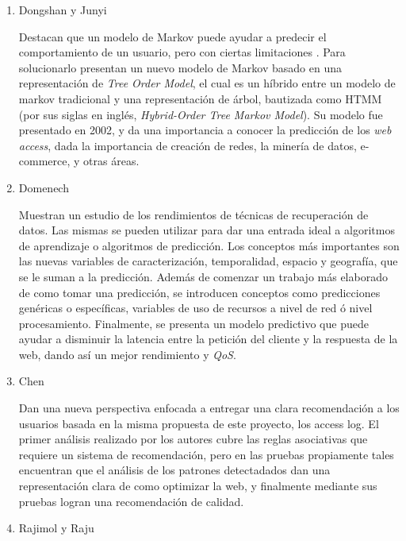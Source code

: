 \begin{enumerate}
  \item Dongshan y Junyi~\cite{Dongshan2002} 
  
  Destacan que un modelo de Markov puede ayudar a predecir el comportamiento de un usuario, pero con ciertas limitaciones .  Para solucionarlo presentan un nuevo modelo de Markov basado en una representación de \emph{Tree Order Model}, el cual es un híbrido entre un modelo de markov tradicional y una representación de árbol, bautizada como HTMM (por sus siglas en inglés, \emph{Hybrid-Order Tree Markov Model}).
  Su modelo fue presentado en 2002, y da una importancia a conocer la predicción de los \emph{web access}, dada la importancia de creación de redes, la minería de datos, e-commerce, y otras áreas.

  \item Domenech \etal~\cite{Domenech2006}
  
  Muestran un estudio de los rendimientos de técnicas de recuperación de datos.
  Las mismas se pueden utilizar para dar una entrada ideal a algoritmos de aprendizaje o algoritmos de predicción. 
  Los conceptos más importantes son las nuevas variables de caracterización, temporalidad, espacio y geografía, que se le suman a la predicción. 
  Además de comenzar un trabajo más elaborado de como tomar una predicción, se introducen conceptos como predicciones genéricas o específicas, variables de uso de recursos a nivel de red ó nivel procesamiento.
  Finalmente, se presenta un modelo predictivo que puede ayudar a disminuir la latencia entre la petición del cliente y la respuesta de la web, dando así un mejor rendimiento y \emph{QoS}.



  \item Chen \etal~\cite{Chen2011} 
  
  Dan una nueva perspectiva enfocada a entregar una clara recomendación a los usuarios basada en la misma propuesta de este proyecto, los access log.
  El primer análisis realizado por los autores cubre las reglas asociativas que requiere un sistema de recomendación, pero en las pruebas propiamente tales encuentran que el análisis de los patrones detectadados dan una representación clara de como optimizar la web, y finalmente mediante sus pruebas logran una recomendación de calidad.

  \item Rajimol y Raju~\cite{Rajimol2012} 
  

\end{enumerate}
